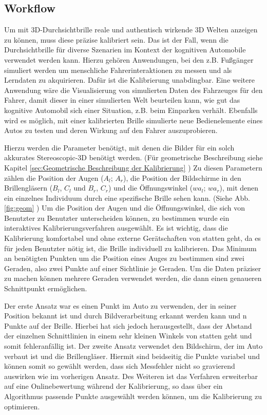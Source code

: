 \subsection{Workflow}
Um mit 3D-Durchsichtbrille reale und authentisch wirkende 3D Welten anzeigen zu können, muss diese präzise kalibriert sein. 
Das ist der Fall, wenn die Durchsichtbrille für diverse Szenarien im Kontext der kognitiven Automobile verwendet werden kann.  
Hierzu gehören Anwendungen, bei den z.B. Fußgänger simuliert werden um menschliche Fahrerinteraktionen zu messen und als Lerndaten zu akquirieren. 
Dafür ist die Kalibrierung unabdingbar.
Eine weitere Anwendung wäre die Visualisierung von simulierten Daten des Fahrzeuges für den Fahrer, damit dieser in einer simulierten Welt beurteilen kann, wie gut das kognitive Automobil sich einer Situation, z.B. beim Einparken verhält. 
Ebenfalls wird es möglich, mit einer kalibrierten Brille simulierte neue Bedienelemente eines Autos zu testen und deren Wirkung auf den Fahrer auszuprobieren.

Hierzu werden die Parameter benötigt, mit denen die Bilder für ein solch akkurates Stereoscopic-3D benötigt werden.
(Für geometrische Beschreibung siehe Kapitel \ref{sec:Geometrische Beschreibung der Kalibrierung} )
Zu diesen Parametern zählen die Position der Augen ($A_{l}$; $A_{r}$), die Position der Bildschirme in den Brillengläsern ($B_{l}$, $C_{l}$ und $B_{r}$, $C_{r}$) und die Öffnungswinkel ($wa_{l}$; $wa_{r}$), mit denen ein einzelnes Individuum durch eine spezifische Brille sehen kann. (Siehe Abb. \ref{fig:geom} )
Um die Position der Augen und die Öffnungswinkel, die sich von Benutzter zu Benutzter unterscheiden können, zu bestimmen wurde ein interaktives Kalibrierungsverfahren ausgewählt. Es ist wichtig, dass die Kalibrierung komfortabel und ohne externe Gerätschaften von statten geht, da es für jeden Benutzter nötig ist, die Brille individuell zu kalibrieren. Das Minimum an benötigten Punkten um die Position eines Auges zu bestimmen sind zwei Geraden, also zwei Punkte auf einer Sichtlinie je Geraden. Um die Daten präziser zu machen können mehrere Geraden verwendet werden, die dann einen genaueren Schnittpunkt ermöglichen. 

Der erste Ansatz war es einen Punkt im Auto zu verwenden, der in seiner Position bekannt ist und durch Bildverarbeitung erkannt werden kann und n Punkte auf der Brille. Hierbei hat sich jedoch herausgestellt, dass der Abstand der einzelnen Schnittlinien in einem sehr kleinen Winkels von statten geht und somit fehleranfällig ist. Der zweite Ansatz verwendet den Bildschirm, der im Auto verbaut ist und die Brillengläser. Hiermit sind beidseitig die Punkte variabel und können somit so gewählt werden, dass sich Messfehler nicht so gravierend auswirken wie im vorherigen Ansatz. Des Weiteren ist das Verfahren erweiterbar auf eine Onlinebewertung während der Kalibrierung, so dass über ein Algorithmus passende Punkte ausgewählt werden können, um die Kalibrierung zu optimieren.

